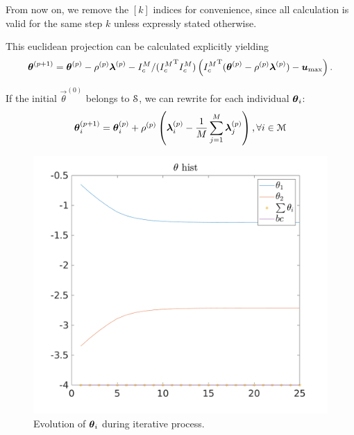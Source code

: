 \documentclass[../main.tex]{subfiles}
\begin{document}
From now on, we remove the $[k]$ indices for convenience, since all calculation is valid for the same step $k$ unless expressly stated otherwise.

This euclidean projection can be calculated explicitly yielding
\begin{equation}
    \boldsymbol{\theta}^{(p+1)}=\boldsymbol{\theta}^{(p)}-\rho^{(p)}\boldsymbol{\lambda}^{(p)}-{I_{c}^M}/({I_{c}^M}^{\mathrm{T}} {I_{c}^M})\left({I_{c}^M}^{\mathrm{T}}(\boldsymbol{\theta}^{(p)}-\rho^{(p)}\boldsymbol{\lambda}^{(p)}) -\boldsymbol{u}_{\max}\right).
\end{equation}

If the initial ${\vec{\theta}}^{(0)}$ belongs to $\mathcal{S}$, we can rewrite for each individual $\boldsymbol{\theta}_i$:
\begin{equation}
  \label{eq:example_projectedSubgradient_lambda}
 \boldsymbol{\theta}_i^{(p+1)}=\boldsymbol{\theta}_i^{(p)}+\rho^{(p)}\left(\boldsymbol{\lambda}_i^{(p)}-\frac{1}{M}\sum_{j=1}^{M}\boldsymbol{\lambda}_j^{(p)}\right),\forall i\in\mathcal{M}
\end{equation}


\begin{figure}[h]
  \centering
  \includegraphics[width=.5\textwidth]{../img/example_theta.png}
  \caption{Evolution of $\boldsymbol{\theta}_i$ during iterative process. }\label{fig:example_theta}
\end{figure}
\end{document}
